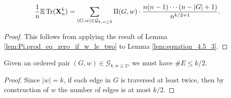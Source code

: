 \begin{lemma}[Simplifying the summation with the fact $\Pi (G,w) = 0$ in certain cases: R-1-16 : lem:equation\_4.8]
  \label{lem:equation_4.8}
  \[
  \frac{1}{n} \mathbb{E} \operatorname{Tr} (\mathbf{X}_n^k) 
  = \sum_{(G,w) \in \mathcal{G}_{k, w \geq 2}} \Pi (G,w) \cdot \frac{n (n-1) \cdots (n - |G| + 1)}{n^{k/2+1}}.
  \]
\end{lemma}
\begin{proof}
  This follows from applying the result of Lemma \ref{lem:Pi.prod_eq_zero_if_w_le_two} to Lemma \ref{lem:equation_4.5_3}.
\end{proof}
\begin{lemma}
  \label{lem:edge_set_order_leq_k_over_two}
  Given an ordered pair $(G,w) \in \mathcal{G}_{k,w \geq 2}$, we must have $\# E \leq k/2$.
\end{lemma}
\begin{proof}
  Since $|w| = k$, if each edge in $G$ is traversed at least twice, then by construction of $w$ the number of edges is at most $k/2$.
\end{proof}






